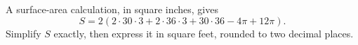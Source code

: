 A surface-area calculation, in square inches, gives
\[
S=2\left(2\cdot30\cdot3+2\cdot36\cdot3+30\cdot36-4\pi+12\pi\right).
\]
Simplify $S$ exactly, then express it in square feet, rounded to two decimal places.
